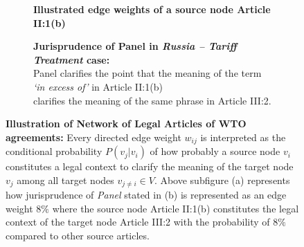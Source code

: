 \begin{figure}[]
    \captionsetup[subfigure]{justification=centering}
    \begin{subfigure}[b]{1\textwidth}
        \centering{
            
        }
        \caption{\textbf{Illustrated edge weights of a source node Article II:1(b)}}
        \label{subfig:a:art2b}
    \end{subfigure}
    \vfill
    \begin{subfigure}[b]{1\textwidth}
        \centering{
            
        }
        \centering
        \caption{\textbf{Jurisprudence of Panel in \textit{Russia – Tariff Treatment} case:} \\ Panel clarifies the point that the meaning of the term \textit{`in excess of'} in Article II:1(b) \\ clarifies the meaning of the same phrase in Article III:2.}
        \label{subfig:a:condprob}
    \end{subfigure}
    \caption{\textbf{Illustration of Network of Legal Articles of WTO agreements: }Every directed edge weight $w_{ij}$ is interpreted as the conditional probability $P(v_j|v_i)$ of how probably a source node $v_i$ constitutes a legal context to clarify the meaning of the target node $v_j$ among all target nodes $v_{j \neq i} \in V$. Above subfigure (a) represents how jurisprudence of \textit{Panel} stated in (b) is represented as an edge weight $8\%$ where the source node Article II:1(b) constitutes the legal context of the target node Article III:2 with the probability of $8\%$ compared to other source articles.}
    \label{fig:def-example}
\end{figure}



